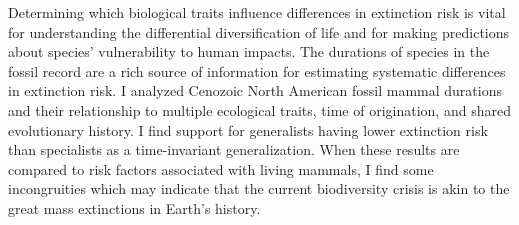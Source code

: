 \documentclass{article}
\begin{document}
Determining which biological traits influence differences in extinction risk is vital for understanding the differential diversification of life and for making predictions about species' vulnerability to human impacts. The durations of species in the fossil record are a rich source of information for estimating systematic differences in extinction risk. I analyzed Cenozoic North American fossil mammal durations and their relationship to multiple ecological traits, time of origination, and shared evolutionary history. I find support for generalists having lower extinction risk than specialists as a time-invariant generalization. When these results are compared to risk factors associated with living mammals, I find some incongruities which may indicate that the current biodiversity crisis is akin to the great mass extinctions in Earth's history.
\end{document}
